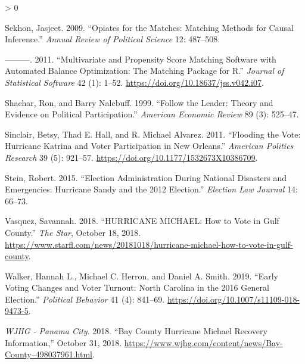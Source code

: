 \documentclass[
  12pt,
]{article}
\newlength{\cslhangindent}
\newenvironment{CSLReferences}[2] %
 {%
  \setlength{\parindent}{0pt}
  \ifodd #1 \everypar{\setlength{\hangindent}{\cslhangindent}}\ignorespaces\fi
  \ifnum #2 > 0
  \setlength{\parskip}{#2\baselineskip}
  \fi
 }%
 {}
\begin{document}
\begin{CSLReferences}{1}{0}
\leavevmode\hypertarget{ref-Sekhon2009}{}%
Sekhon, Jasjeet. 2009. {``Opiates for the {Matches}: {Matching Methods} for {Causal Inference}.''} \emph{Annual Review of Political Science} 12: 487--508.

\leavevmode\hypertarget{ref-Sekhon2011}{}%
---------. 2011. {``Multivariate and {Propensity Score Matching Software} with {Automated Balance Optimization}: {The Matching} Package for {R}.''} \emph{Journal of Statistical Software} 42 (1): 1--52. \url{https://doi.org/10.18637/jss.v042.i07}.

\leavevmode\hypertarget{ref-Shachar1999}{}%
Shachar, Ron, and Barry Nalebuff. 1999. {``Follow the {Leader}: {Theory} and {Evidence} on {Political Participation}.''} \emph{American Economic Review} 89 (3): 525--47.

\leavevmode\hypertarget{ref-Sinclair2011}{}%
Sinclair, Betsy, Thad E. Hall, and R. Michael Alvarez. 2011. {``Flooding the {Vote}: {Hurricane Katrina} and {Voter Participation} in {New Orleans}.''} \emph{American Politics Research} 39 (5): 921--57. \url{https://doi.org/10.1177/1532673X10386709}.

\leavevmode\hypertarget{ref-Stein2015}{}%
Stein, Robert. 2015. {``Election {Administration During National Disasters} and {Emergencies}: {Hurricane Sandy} and the 2012 {Election}.''} \emph{Election Law Journal} 14: 66--73.

\leavevmode\hypertarget{ref-Vasquez2018}{}%
Vasquez, Savannah. 2018. {``{HURRICANE MICHAEL}: {How} to Vote in {Gulf County}.''} \emph{The Star}, October 18, 2018. \url{https://www.starfl.com/news/20181018/hurricane-michael-how-to-vote-in-gulf-county}.

\leavevmode\hypertarget{ref-Walker2019}{}%
Walker, Hannah L., Michael C. Herron, and Daniel A. Smith. 2019. {``Early {Voting Changes} and {Voter Turnout}: {North Carolina} in the 2016 {General Election}.''} \emph{Political Behavior} 41 (4): 841--69. \url{https://doi.org/10.1007/s11109-018-9473-5}.

\leavevmode\hypertarget{ref-WJHG2018}{}%
\emph{WJHG - Panama City}. 2018. {``Bay {County Hurricane Michael Recovery Information},''} October 31, 2018. \url{https://www.wjhg.com/content/news/Bay-County–498037961.html}.

\end{CSLReferences}
\end{document}
